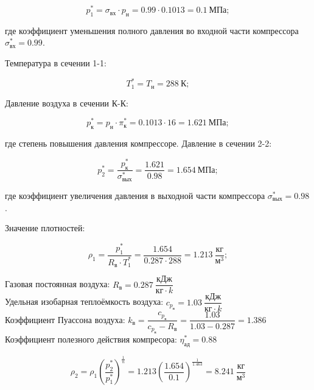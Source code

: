 \begin{equation} \label{eu_eqn}
	p_{1}^*=\sigma_{\text{вх}}\cdot p_{\text{н}}=0.99\cdot 0.1013=0.1 \ \text{МПа};
\end{equation}

где коэффициент уменьшения полного давления во входной части компрессора $\sigma_{\text{вх}}^*=0.99$.

Температура в сечении 1-1:

\begin{equation} \label{eu_eqn}
	T_{1}^*=T_{\text{н}}=288 \ \text{К};
\end{equation}

Давление воздуха в сечении К-К:

\begin{equation} \label{eu_eqn}
	p_{\text{к}}^*=p_{\text{н}}\cdot \pi_{\text{к}}^*=0.1013\cdot16=1.621 \ \text{МПа};
\end{equation}

где  степень повышения давления компрессоре.
Давление в сечении 2-2:

\begin{equation} \label{eu_eqn}
	p_{2}^*=\dfrac{p_{\text{к}}^*}{\sigma_{\text{вых}}^*}=\dfrac{1.621}{0.98}=1.654 \  \text{МПа};
\end{equation}

где коэффициент увеличения давления в выходной части компрессора $\sigma_{\text{вых}}^*=0.98$.


Значение плотностей:

\begin{equation} \label{eu_eqn}
	\rho_{1}=\dfrac{p_{1}^*}{R_{\text{в}}\cdot T_{1}^*}= \dfrac{1.654}{0.287\cdot288} =1.213 \ \dfrac{\text{кг}}{\text{м}^3};
\end{equation}

Газовая постоянная воздуха: $R_{\text{в}}=0.287 \ \dfrac{\text{кДж}}{\text{кг}\cdot k}$ \\
Удельная изобарная теплоёмкость воздуха: $c_{p_\text{в}}=1.03 \ \dfrac{\text{кДж}}{\text{кг}\cdot k}$\\
Коэффициент Пуассона воздуха: $k_{\text{в}}=\dfrac{c_{p_{\text{в}}}}{c_{p_{\text{в}}}-R_{\text{в}}}=\dfrac{1.03}{1.03-0.287}=1.386$\\
Коэффициент полезного действия компресора: $\eta^*_{\text{ад}}=0.88$

\begin{equation} \label{eu_eqn}
	\rho_{2}=\rho_{1}(\dfrac{p_{2}^*}{p_{1}^*})^{\frac{1}{n}}=1.213(\dfrac{1.654}{0.1})^{\frac{1}{1.463}}=8.241 \ \dfrac{\text{кг}}{\text{м}^3}
\end{equation}

